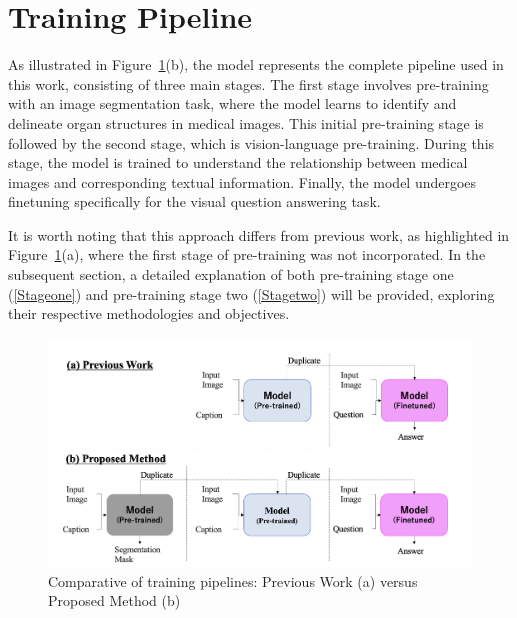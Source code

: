 \section{Training Pipeline}
\label{training}
 As illustrated in Figure~\ref{fig:compare}(b), the model represents the complete pipeline used in this work, consisting of three main stages. The first stage involves pre-training with an image segmentation task, where the model learns to identify and delineate organ structures in medical images. This initial pre-training stage is followed by the second stage, which is vision-language pre-training. During this stage, the model is trained to understand the relationship between medical images and corresponding textual information. Finally, the model undergoes finetuning specifically for the visual question answering task.

It is worth noting that this approach differs from previous work, as highlighted in Figure~\ref{fig:compare}(a), where the first stage of pre-training was not incorporated. In the subsequent section, a detailed explanation of both pre-training stage one (\ref{Stageone}) and pre-training stage two (\ref{Stagetwo}) will be provided, exploring their respective methodologies and objectives.

\begin{figure}[t]
\begin{center}
\includegraphics[width=1.0\linewidth]{Chapter_3/chap3_compare.png}
\end{center}
   \caption{Comparative of training pipelines: Previous Work (a) versus Proposed Method (b)
}
\label{fig:compare}
\end{figure}

